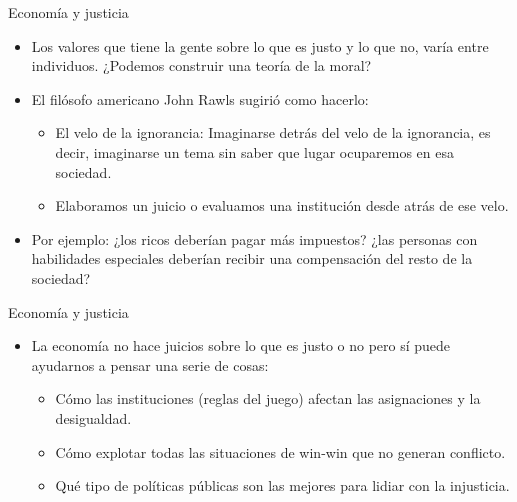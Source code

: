 \documentclass{beamer}
\begin{document}
\begin{frame}{Economía y justicia}
    \begin{itemize}
        \item Los valores que tiene la gente sobre lo que es justo y lo que no, varía entre individuos. ¿Podemos construir una teoría de la moral?
        \item El filósofo americano John Rawls sugirió como hacerlo:
        \begin{itemize}
            \item El velo de la ignorancia: Imaginarse detrás del velo de la ignorancia, es decir, imaginarse un tema sin saber que lugar ocuparemos en esa sociedad.
            \item Elaboramos un juicio o evaluamos una institución desde atrás de ese velo.
        \end{itemize}
        \item Por ejemplo: ¿los ricos deberían pagar más impuestos? ¿las personas con habilidades especiales deberían recibir una compensación del resto de la sociedad? 
    \end{itemize}
\end{frame}

\begin{frame}{Economía y justicia}
    \begin{itemize}
        \item La economía no hace juicios sobre lo que es justo o no pero sí puede ayudarnos a pensar una serie de cosas:
        \begin{itemize}
            \item Cómo las instituciones (reglas del juego) afectan las asignaciones y la desigualdad.
            \item Cómo explotar todas las situaciones de win-win que no generan conflicto.
            \item Qué tipo de políticas públicas son las mejores para lidiar con la injusticia.
        \end{itemize}
    \end{itemize}
\end{frame}
\end{document}
